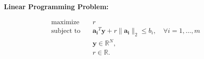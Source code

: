 \documentclass{article}
\begin{document}
\textbf{Linear Programming Problem:}

\[
\begin{align*}
\text{maximize} \quad & r \\
\text{subject to} \quad & \mathbf{a_i}^T \mathbf{y} + r \|\mathbf{a_i}\|_2 \leq b_i, \quad \forall i = 1, \ldots, m \\
& \mathbf{y} \in \mathbb{R}^N, \\
& r \in \mathbb{R}.
\end{align*}
\]
\end{document}
